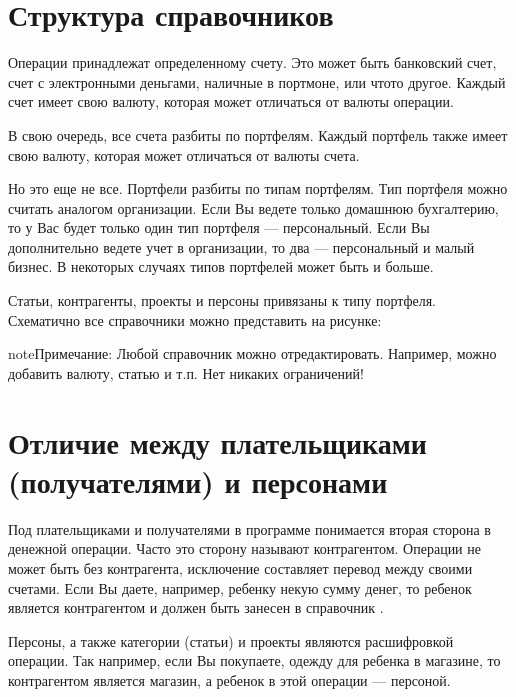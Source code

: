 \documentclass[a4paper,10pt,russian]{sphinxmanual}
\begin{document}
\section{Структура справочников}
\label{\detokenize{intro:id3}}
\sphinxAtStartPar
Операции принадлежат определенному счету. Это может быть банковский счет, счет с электронными деньгами, наличные в портмоне,
или что\sphinxhyphen{}то другое. Каждый счет имеет свою валюту, которая может отличаться от валюты операции.

\sphinxAtStartPar
В свою очередь, все счета разбиты по портфелям. Каждый портфель также имеет свою валюту, которая может отличаться от валюты счета.

\sphinxAtStartPar
Но это еще не все. Портфели разбиты по типам портфелям. Тип портфеля можно считать аналогом организации.
Если Вы ведете только домашнюю бухгалтерию, то у Вас будет только один тип портфеля — персональный. Если Вы
дополнительно ведете учет в организации, то два — персональный и малый бизнес. В некоторых случаях типов
портфелей может быть и больше.

\sphinxAtStartPar
Статьи, контрагенты, проекты и персоны привязаны к типу портфеля. Схематично все справочники можно представить на рисунке:


\begin{sphinxadmonition}{note}{Примечание:}
\sphinxAtStartPar
Любой справочник можно отредактировать. Например, можно добавить валюту, статью и т.п. Нет никаких ограничений!
\end{sphinxadmonition}


\section{Отличие между плательщиками (получателями) и персонами}
\label{\detokenize{intro:id4}}
\sphinxAtStartPar
Под плательщиками и получателями в программе понимается вторая сторона в денежной операции. Часто это сторону называют
контрагентом. Операции не может быть без контрагента, исключение составляет перевод между своими счетами. Если Вы даете, например,
ребенку некую сумму денег, то ребенок является контрагентом и должен быть занесен в справочник .

\sphinxAtStartPar
Персоны, а также категории (статьи) и проекты являются расшифровкой операции. Так например, если Вы покупаете, одежду для
ребенка в магазине, то контрагентом является магазин, а ребенок в этой операции — персоной.
\end{document}
